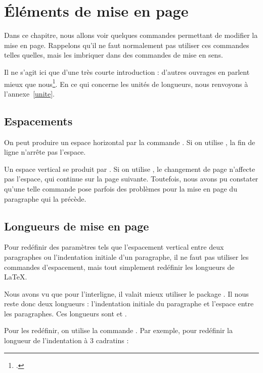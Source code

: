 \chapter{Éléments de mise en page}\label{espacement}

\begin{intro}
Dans ce chapitre, nous allons voir quelques commandes permettant de modifier la mise en page.
Rappelons qu'il ne faut normalement pas utiliser ces commandes telles quelles, mais les imbriquer dans des commandes de mise en sens.

Il ne s'agit ici que d'une très courte introduction : d'autres ouvrages en parlent mieux que nous\footcites(En particulier)(){frama}{latex_graphic_companion}.
En ce qui concerne les unités de longueurs, nous renvoyons à l'annexe~\ref{unite}.
\end{intro}

\section{Espacements}\label{espace}

On peut produire un espace horizontal par la commande . Si on utilise , la fin de ligne n'arrête pas l'espace.

Un espace vertical se produit par . Si on utilise , le changement de page n'affecte pas  l'espace, qui continue sur la page suivante. Toutefois, nous avons pu constater qu'une telle commande pose parfois des problèmes pour la mise en page du paragraphe qui la précède.



\section{Longueurs de mise en page}

Pour redéfinir des paramètres tels que l'espacement vertical entre deux paragraphes ou l'indentation initiale d'un paragraphe, il ne faut pas utiliser les commandes d'espacement, mais tout simplement redéfinir les longueurs de \LaTeX. 

Nous avons vu que pour l'interligne, il valait mieux utiliser le package . Il nous reste donc deux longueurs : l'indentation initiale du paragraphe et l'espace entre les paragraphes. Ces longueurs sont  et .

Pour les redéfinir, on utilise la commande . Par exemple, pour redéfinir la longueur de l'indentation à 3 cadratins :\label{setlength}

